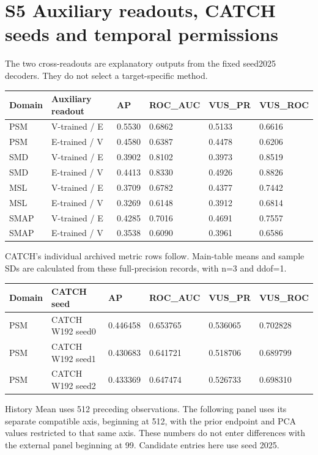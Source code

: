 \documentclass[
  english,
  9pt,
]{article}
\begin{document}
\section{S5 Auxiliary readouts, CATCH seeds and temporal
permissions}\label{s5-auxiliary-readouts-catch-seeds-and-temporal-permissions}

The two cross-readouts are explanatory outputs from the fixed seed2025
decoders. They do not select a target-specific method.

\begin{longtable}[]{@{}llllll@{}}
\toprule\noalign{}
Domain & Auxiliary readout & AP & ROC\_AUC & VUS\_PR & VUS\_ROC \\
\midrule\noalign{}
\endhead
\bottomrule\noalign{}
\endlastfoot
PSM & V-trained / E & 0.5530 & 0.6862 & 0.5133 & 0.6616 \\
PSM & E-trained / V & 0.4580 & 0.6387 & 0.4478 & 0.6206 \\
SMD & V-trained / E & 0.3902 & 0.8102 & 0.3973 & 0.8519 \\
SMD & E-trained / V & 0.4413 & 0.8330 & 0.4926 & 0.8826 \\
MSL & V-trained / E & 0.3709 & 0.6782 & 0.4377 & 0.7442 \\
MSL & E-trained / V & 0.3269 & 0.6148 & 0.3912 & 0.6814 \\
SMAP & V-trained / E & 0.4285 & 0.7016 & 0.4691 & 0.7557 \\
SMAP & E-trained / V & 0.3538 & 0.6090 & 0.3961 & 0.6586 \\
\end{longtable}

CATCH's individual archived metric rows follow. Main-table means and
sample SDs are calculated from these full-precision records, with n=3
and ddof=1.

\begin{longtable}[]{@{}llllll@{}}
\toprule\noalign{}
Domain & CATCH seed & AP & ROC\_AUC & VUS\_PR & VUS\_ROC \\
\midrule\noalign{}
\endhead
\bottomrule\noalign{}
\endlastfoot
PSM & CATCH W192 seed0 & 0.446458 & 0.653765 & 0.536065 & 0.702828 \\
PSM & CATCH W192 seed1 & 0.430683 & 0.641721 & 0.518706 & 0.689799 \\
PSM & CATCH W192 seed2 & 0.433369 & 0.647474 & 0.526733 & 0.698310 \\
\end{longtable}

History Mean uses 512 preceding observations. The following panel uses
its separate compatible axis, beginning at 512, with the prior endpoint
and PCA values restricted to that same axis. These numbers do not enter
differences with the external panel beginning at 99. Candidate entries
here use seed 2025.
\end{document}
